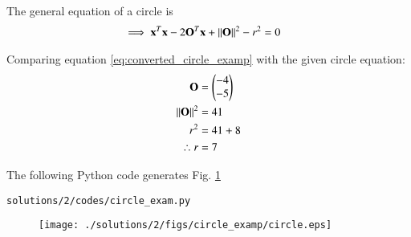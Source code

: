 
The general equation of a circle is 
\begin{align}
\implies \mathbf{x}^T\mathbf{x} - 2\mathbf{O}^T\mathbf{x} + \left\lVert\mathbf{O}\right\rVert^2 - r^2  &= 0 \label{eq:converted_circle_examp}
\end{align}

Comparing equation \eqref{eq:converted_circle_examp} with the given circle equation:
\begin{align}
\mathbf{O} &= \begin{pmatrix}-4\\-5\end{pmatrix}\\
\left\lVert\mathbf{O}\right\rVert^2 &= 41 \\
r^2 &= 41 + 8 \\
\therefore r &= 7
\end{align}

The following Python code generates Fig. \ref{fig:4.2.2_circle2_circle_examp}

\begin{lstlisting}
solutions/2/codes/circle_exam.py
\end{lstlisting}
 
\begin{figure}[!ht]
\centering
\texttt{[image: ./solutions/2/figs/circle\_examp/circle.eps]}
\caption{}
\label{fig:4.2.2_circle2_circle_examp}
\end{figure} 


